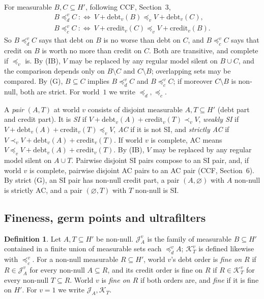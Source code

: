 \documentclass[11pt]{article}
\theoremstyle{definition}\newtheorem{definition}[theorem]{Definition}
\theoremstyle{remark}\newtheorem{remark}[theorem]{Remark}
\newcommand{\debt}{\mathrm{debt}}
\newcommand{\cred}{\mathrm{credit}}
\newcommand{\Jid}{\mathcal J}
\newcommand{\Kid}{\mathcal K}
\begin{document}
For measurable $B,C\subseteq H'$, following CCF, Section~3,
\begin{gather*}
 B\preceq^v_dC\ :\Longleftrightarrow\ V+\debt_v(B)\preceq_vV+\debt_v(C),\\
 B\preceq^v_cC\ :\Longleftrightarrow\ V+\cred_v(C)\preceq_vV+\cred_v(B).
\end{gather*}
So $B\preceq^v_dC$ says that debt on $B$ is no worse than debt on $C$, and
$B\preceq^v_cC$ says that credit on $B$ is worth no more than credit on
$C$. Both are transitive, and complete if $\preceq_v$ is. By (IB), $V$ may
be replaced by any regular model silent on $B\cup C$, and the comparison
depends only on $B\setminus C$ and $C\setminus B$; overlapping sets may be
compared. By (G), $B\subseteq C$ implies $B\preceq^v_dC$ and
$B\preceq^v_cC$; if moreover $C\setminus B$ is non-null, both are strict.
For world~$1$ we write $\preceq_d,\preceq_c$.

A \emph{pair} $(A,T)$ at world $v$ consists of disjoint measurable
$A,T\subseteq H'$ (debt part and credit part). It is \emph{SI} if
$V+\debt_v(A)+\cred_v(T)\prec_vV$, \emph{weakly SI} if
$V+\debt_v(A)+\cred_v(T)\preceq_vV$, \emph{AC} if it is not SI, and
\emph{strictly AC} if $V\prec_vV+\debt_v(A)+\cred_v(T)$. If world $v$ is
complete, AC means $V\preceq_vV+\debt_v(A)+\cred_v(T)$. By (IB), $V$ may be
replaced by any regular model silent on $A\cup T$. Pairwise disjoint SI pairs
compose to an SI pair, and, if world $v$ is complete, pairwise disjoint
AC pairs to an AC pair (CCF, Section~6). By strict (G), an SI pair has non-null credit part, a pair
$(A,\varnothing)$ with $A$ non-null is strictly AC, and a pair
$(\varnothing,T)$ with $T$ non-null is SI.

\subsection{Fineness, germ points and ultrafilters}\label{sec:germs}

\begin{definition}\label{def:fine}
Let $A,T\subseteq H'$ be non-null. $\Jid^v_A$ is the family of measurable
$B\subseteq H'$ contained in a finite union of measurable sets each
$\preceq^v_dA$; $\Kid^v_T$ is defined likewise with $\preceq^v_c$. For a
non-null measurable $R\subseteq H'$, world $v$'s debt order is \emph{fine on
$R$} if $R\in\Jid^v_A$ for every non-null $A\subseteq R$, and its credit
order is fine on $R$ if $R\in\Kid^v_T$ for every non-null $T\subseteq R$.
World $v$ is \emph{fine on $R$} if both orders are, and \emph{fine} if it is
fine on $H'$. For $v=1$ we write $\Jid_A,\Kid_T$.
\end{definition}
\end{document}
